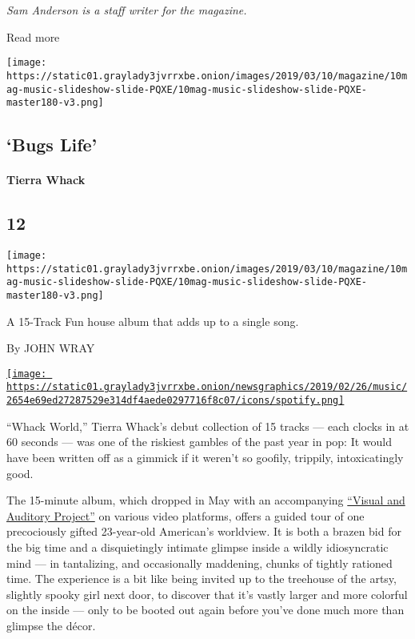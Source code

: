 \emph{Sam Anderson is a staff writer for the magazine.}

Read more

\texttt{[image: https://static01.graylady3jvrrxbe.onion/images/2019/03/10/magazine/10mag-music-slideshow-slide-PQXE/10mag-music-slideshow-slide-PQXE-master180-v3.png]}

\hypertarget{--bugs-life}{%
\subsection{\texorpdfstring{ `Bugs
Life'}{  `Bugs Life'}}\label{--bugs-life}}

\hypertarget{tierra-whack}{%
\paragraph{Tierra Whack}\label{tierra-whack}}

\hypertarget{12}{%
\subsection{12}\label{12}}

\texttt{[image: https://static01.graylady3jvrrxbe.onion/images/2019/03/10/magazine/10mag-music-slideshow-slide-PQXE/10mag-music-slideshow-slide-PQXE-master180-v3.png]}

A 15-Track Fun house album that adds up to a single song.

By JOHN WRAY

\href{https://open.spotify.com/track/4lLdrM9fpLA1Pcng9WNMLp}{\texttt{[image: https://static01.graylady3jvrrxbe.onion/newsgraphics/2019/02/26/music/2654e69ed27287529e314df4aede0297716f8c07/icons/spotify.png]}}

``Whack World,'' Tierra Whack's debut collection of 15 tracks --- each
clocks in at 60 seconds --- was one of the riskiest gambles of the past
year in pop: It would have been written off as a gimmick if it weren't
so goofily, trippily, intoxicatingly good.

The 15-minute album, which dropped in May with an accompanying
\href{https://youtu.be/EOTebhPy04g}{``Visual and Auditory Project''} on
various video platforms, offers a guided tour of one precociously gifted
23-year-old American's worldview. It is both a brazen bid for the big
time and a disquietingly intimate glimpse inside a wildly idiosyncratic
mind --- in tantalizing, and occasionally maddening, chunks of tightly
rationed time. The experience is a bit like being invited up to the
treehouse of the artsy, slightly spooky girl next door, to discover that
it's vastly larger and more colorful on the inside --- only to be booted
out again before you've done much more than glimpse the décor.

